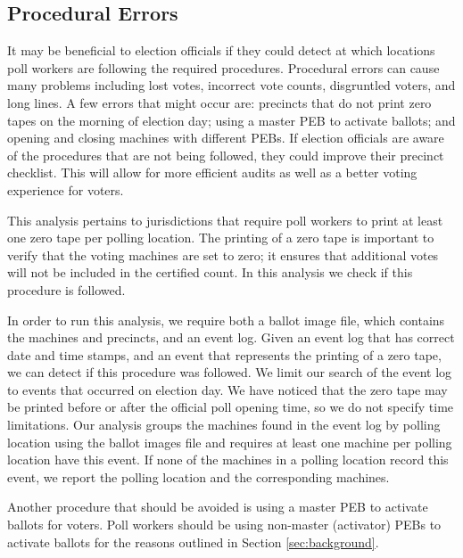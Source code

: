 \subsection{Procedural Errors}
\smvertspace
It may be beneficial to election officials if they could detect at which
locations poll workers are following the required procedures. Procedural errors
can cause many problems including lost votes, incorrect vote counts, disgruntled
voters, and long lines. A few errors that might occur are: precincts that do not
print zero tapes on the morning of election day; using a master PEB to activate
ballots; and opening and closing machines with different PEBs. If election
officials are aware of the procedures that are not being followed, they could
improve their precinct checklist. This will allow for more efficient audits as
well as a better voting experience for voters. 

This analysis pertains to jurisdictions that require poll workers to
print at least one zero tape per polling location. The printing of a zero tape
is important to verify that the voting machines are set to zero; it
ensures that additional votes will not be included in the certified
count. In this analysis we check if this procedure is followed.

In order to run this analysis, we require both a ballot image file, which
contains the machines and precincts, and an event log.  Given an event log that
has correct date and time stamps, and an event that represents the printing of a
zero tape, we can detect if this procedure was followed.  We limit our search of
the event log to events that occurred on election day.  We have noticed that the
zero tape may be printed before or after the official poll opening time, so we
do not specify time limitations.  Our analysis groups the machines found in the
event log by polling location using the ballot images file and requires at least
one machine per polling location have this event. If none of the
machines in a polling location record this event, we report the polling location
and the corresponding machines. 

Another procedure that should be avoided is using a master PEB to activate ballots for voters.  Poll workers should be using non-master (activator) PEBs to activate ballots for the reasons outlined in Section \ref{sec:background}.

